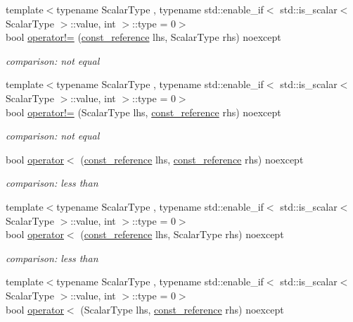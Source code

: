 \begin{DoxyCompactItemize}
{\footnotesize template$<$typename Scalar\+Type , typename std\+::enable\+\_\+if$<$ std\+::is\+\_\+scalar$<$ Scalar\+Type $>$\+::value, int $>$\+::type  = 0$>$ }\\bool \hyperlink{classnlohmann_1_1basic__json_a4d581dc2ab78091885f9af24d13749dc}{operator!=} (\hyperlink{classnlohmann_1_1basic__json_ab8a1c33ee7b154fc41ca2545aa9724e6}{const\+\_\+reference} lhs, Scalar\+Type rhs) noexcept
\begin{DoxyCompactList}\small\item\em comparison\+: not equal \end{DoxyCompactList}\item 
{\footnotesize template$<$typename Scalar\+Type , typename std\+::enable\+\_\+if$<$ std\+::is\+\_\+scalar$<$ Scalar\+Type $>$\+::value, int $>$\+::type  = 0$>$ }\\bool \hyperlink{classnlohmann_1_1basic__json_aa9861979059799375c0fff68174610ba}{operator!=} (Scalar\+Type lhs, \hyperlink{classnlohmann_1_1basic__json_ab8a1c33ee7b154fc41ca2545aa9724e6}{const\+\_\+reference} rhs) noexcept
\begin{DoxyCompactList}\small\item\em comparison\+: not equal \end{DoxyCompactList}\item 
bool \hyperlink{classnlohmann_1_1basic__json_aacd442b66140c764c594ac8ad7dfd5b3}{operator$<$} (\hyperlink{classnlohmann_1_1basic__json_ab8a1c33ee7b154fc41ca2545aa9724e6}{const\+\_\+reference} lhs, \hyperlink{classnlohmann_1_1basic__json_ab8a1c33ee7b154fc41ca2545aa9724e6}{const\+\_\+reference} rhs) noexcept
\begin{DoxyCompactList}\small\item\em comparison\+: less than \end{DoxyCompactList}\item 
{\footnotesize template$<$typename Scalar\+Type , typename std\+::enable\+\_\+if$<$ std\+::is\+\_\+scalar$<$ Scalar\+Type $>$\+::value, int $>$\+::type  = 0$>$ }\\bool \hyperlink{classnlohmann_1_1basic__json_a52907b78829a55473f2548530cf2c1c7}{operator$<$} (\hyperlink{classnlohmann_1_1basic__json_ab8a1c33ee7b154fc41ca2545aa9724e6}{const\+\_\+reference} lhs, Scalar\+Type rhs) noexcept
\begin{DoxyCompactList}\small\item\em comparison\+: less than \end{DoxyCompactList}\item 
{\footnotesize template$<$typename Scalar\+Type , typename std\+::enable\+\_\+if$<$ std\+::is\+\_\+scalar$<$ Scalar\+Type $>$\+::value, int $>$\+::type  = 0$>$ }\\bool \hyperlink{classnlohmann_1_1basic__json_a71f65ff3abee4c140e27ca64fa327973}{operator$<$} (Scalar\+Type lhs, \hyperlink{classnlohmann_1_1basic__json_ab8a1c33ee7b154fc41ca2545aa9724e6}{const\+\_\+reference} rhs) noexcept

\end{DoxyCompactItemize}
